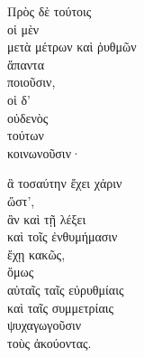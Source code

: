 

{\large
\noindent Πρὸς δὲ τούτοις \\
οἱ μὲν \\
\tabto{2em} μετὰ μέτρων καὶ ῥυθμῶν \\
ἅπαντα\\
ποιοῦσιν, \\
οἱ δ' \\
οὐδενὸς \\
\tabto{2em} τούτων \\
κοινωνοῦσιν·

\noindent ἃ τοσαύτην ἔχει χάριν \\
\tabto{2em} ὥστ',\\
\tabto{4em} ἂν καὶ τῇ λέξει \\
\tabto{6em} καὶ τοῖς ἐνθυμήμασιν \\
\tabto{4em} ἔχῃ κακῶς,\\
\tabto{2em} ὅμως \\
\tabto{4em} αὐταῖς ταῖς εὐρυθμίαις \\
\tabto{4em} καὶ ταῖς συμμετρίαις \\
\tabto{2em} ψυχαγωγοῦσιν \\
\tabto{4em} τοὺς ἀκούοντας.

}

